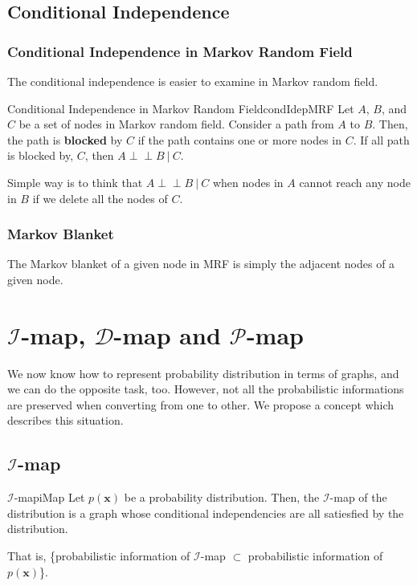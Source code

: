 \documentclass{article}
\newcommand{\indep}{\perp \!\!\! \perp}
\begin{document}
    \subsection{Conditional Independence}
        \subsubsection{Conditional Independence in Markov Random Field}
            The conditional independence is easier to examine in Markov random field.
            \begin{thm}{Conditional Independence in Markov Random Field}{condIdepMRF}
                Let $A$, $B$, and $C$ be a set of nodes in Markov random field.
                Consider a path from $A$ to $B$. Then, the path is \textbf{blocked} by $C$
                if the path contains one or more nodes in $C$. If all path is blocked by, $C$,
                then $A \indep B\ | \ C$.
            \end{thm}
            Simple way is to think that $A \indep B\ | \ C$ when nodes in $A$ cannot reach any node in $B$
            if we delete all the nodes of $C$.
        \subsubsection{Markov Blanket}
            The Markov blanket of a given node in MRF is simply the adjacent nodes of a given node.

\section{$\mathcal I$-map, $\mathcal D$-map and $\mathcal P$-map}
    We now know how to represent probability distribution in terms of graphs, and we can do the opposite
    task, too. However, not all the probabilistic informations are preserved when converting from one to other.
    We propose a concept which describes this situation.
    \subsection{$\mathcal I$-map}
        \begin{defn}{$\mathcal I$-map}{iMap}
            Let $p(\mathbf{x})$ be a probability distribution. Then, the $\mathcal I$-map of the
            distribution is a graph whose conditional independencies are all satiesfied by the distribution.
        \end{defn}
        That is, \{probabilistic information of $\mathcal I$-map $\subset$ probabilistic information of $p(\mathbf{x})$\}.
\end{document}
